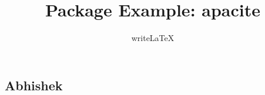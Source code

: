 \documentclass{article}
\title{Package Example: apacite}
\author{writeLaTeX}
\begin{document}
\subsection{Abhishek}
\end{document}
